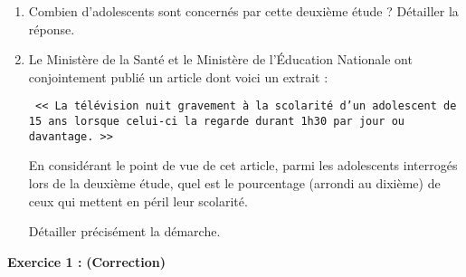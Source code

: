 \documentclass[10pt,french]{article}
\newcommand{\Exercice}[1]{\textbf{\large{Exercice #1 :}\xspace}}
\begin{document}
\begin{enumerate}[resume]
    \item Combien d'adolescents sont concernés par cette deuxième étude ? Détailler la réponse.
    \item Le Ministère de la Santé et le Ministère de l'\'Education Nationale ont conjointement publié un article dont voici un extrait :
    \begin{center}
    \tt
    << La télévision nuit gravement à la scolarité d'un adolescent de 15 ans lorsque celui-ci la regarde durant 1h30 par jour ou davantage. >>
    \end{center}
    En considérant le point de vue de cet article, parmi les adolescents interrogés lors de la deuxième étude, quel est le pourcentage (arrondi au dixième) de ceux qui mettent en péril leur scolarité.\par Détailler précisément la démarche.
\end{enumerate}

\clearpage


\Exercice{1} \textbf{(Correction)}%
\end{document}
